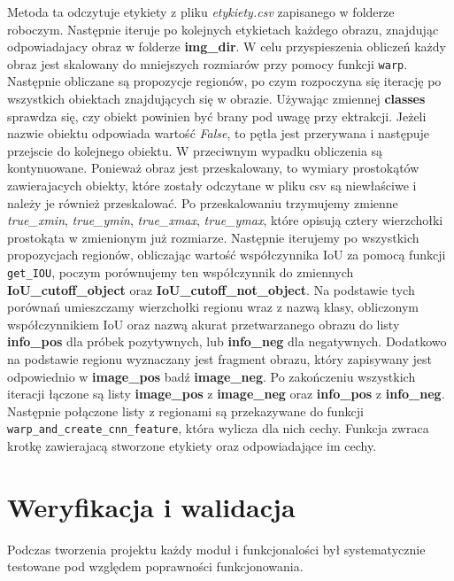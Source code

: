 \documentclass[a4paper,twoside,12pt]{book}
\begin{document}
{Metoda ta odczytuje etykiety z pliku \emph{etykiety.csv} zapisanego w folderze roboczym. Następnie iteruje po kolejnych etykietach każdego obrazu, znajdując odpowiadajacy obraz w folderze \textbf{img\_dir}. W celu przyspieszenia obliczeń każdy obraz jest skalowany do mniejszych rozmiarów przy pomocy funkcji \lstinline|warp|. Następnie obliczane są propozycje regionów, po czym rozpoczyna się iterację po wszystkich obiektach znajdujących się w obrazie. Używając zmiennej \textbf{classes} sprawdza się, czy obiekt powinien być brany pod uwagę przy ektrakcji. Jeżeli nazwie obiektu odpowiada wartość \emph{False}, to pętla jest przerywana i następuje przejscie do kolejnego obiektu. W przeciwnym wypadku obliczenia są kontynuowane. Ponieważ obraz jest przeskalowany, to wymiary prostokątów zawierajacych obiekty, które zostały odczytane w pliku csv są niewłaściwe i należy je również przeskalować. Po przeskalowaniu trzymujemy zmienne \emph{true\_xmin}, \emph{true\_ymin}, \emph{true\_xmax}, \emph{true\_ymax}, które opisują cztery wierzchołki prostokąta w zmienionym już rozmiarze. Następnie iterujemy po wszystkich propozycjach regionów, obliczając wartość współczynnika IoU za pomocą funkcji \lstinline|get_IOU|, poczym  porównujemy ten współczynnik do zmiennych \textbf{IoU\_cutoff\_object} oraz \textbf{IoU\_cutoff\_not\_object}. Na podstawie tych porównań umieszczamy wierzchołki regionu wraz z nazwą klasy, obliczonym współczynnikiem IoU oraz nazwą akurat przetwarzanego obrazu do listy \textbf{info\_pos} dla próbek pozytywnych, lub \textbf{info\_neg} dla negatywnych. Dodatkowo na podstawie regionu wyznaczany jest fragment obrazu, który zapisywany jest odpowiednio w \textbf{image\_pos} badź \textbf{image\_neg}. Po zakończeniu wszystkich iteracji łączone są listy \textbf{image\_pos} z \textbf{image\_neg} oraz \textbf{info\_pos} z \textbf{info\_neg}. Następnie połączone listy z regionami są przekazywane do funkcji \lstinline|warp_and_create_cnn_feature|, która wylicza dla nich cechy. Funkcja zwraca krotkę zawierajacą stworzone etykiety oraz odpowiadające im cechy.




\chapter{Weryfikacja i walidacja}
{Podczas tworzenia projektu każdy moduł i funkcjonalości był systematycznie testowane pod względem poprawności funkcjonowania.}
}
\end{document}
